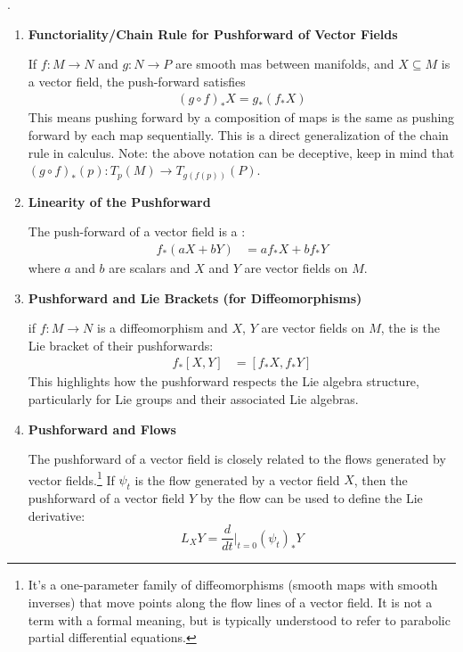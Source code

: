 \documentclass[10pt,a4paper]{report}
\begin{document}
 \HLINE
 \begin{remark}.
 
 \begin{enumerate}
 	\item \textbf{Functoriality/Chain Rule for Pushforward of Vector Fields}
 	
 	If $f: M \to N$ and $g: N \to P$ are smooth mas between manifolds, and $X \subseteq M$ is a vector field, the push-forward satisfies 
 	\begin{align*}
 		(g \circ f)_*X=g_*(f_*X)
 	\end{align*}This means pushing forward by a composition of maps is the same as pushing forward by each map sequentially. This is a direct generalization of the chain rule in calculus. Note: the above notation can be deceptive, keep in mind that $(g \circ f)_*(p): T_p(M) \to T_{g(f(p))}(P)$.
 	
 	\item \textbf{Linearity of the Pushforward}
 	
 	The push-forward of a vector field is a :
 	\begin{align*}
 		f_*(aX+bY) &= af_*X + bf_*Y  
 	\end{align*}where $a$ and $b$ are scalars and $X$ and $Y$ are vector fields on $M$.
 	
 	\item \textbf{Pushforward and Lie Brackets (for Diffeomorphisms)}
 	
 	if $f : M \to N$ is a diffeomorphism and $X$, $Y$ are vector fields on $M$, the  is the Lie bracket of their pushforwards:
 	\begin{align*}
 		f_*[X,Y] &= [f_*X,f_*Y]
 	\end{align*}This highlights how the pushforward respects the Lie algebra structure, particularly for Lie groups and their associated Lie algebras. 
 	
 	\item \textbf{Pushforward and Flows} 
 	
 	The pushforward of a vector field is closely related to the flows generated by vector fields.\footnote{It's a one-parameter family of diffeomorphisms (smooth maps with smooth inverses) that move points along the flow lines of a vector field.  It is not a term with a formal meaning, but is typically understood to refer to parabolic partial differential equations.} If \(\psi _{t}\) is the flow generated by a vector field \(X\), then the pushforward of a vector field \(Y\) by the flow can be used to define the Lie derivative: \[L_{X}Y=\frac{d}{dt}|_{t=0}(\psi _{t})_{*}Y\] 	
 	

\end{enumerate}
\end{remark}
\end{document}
